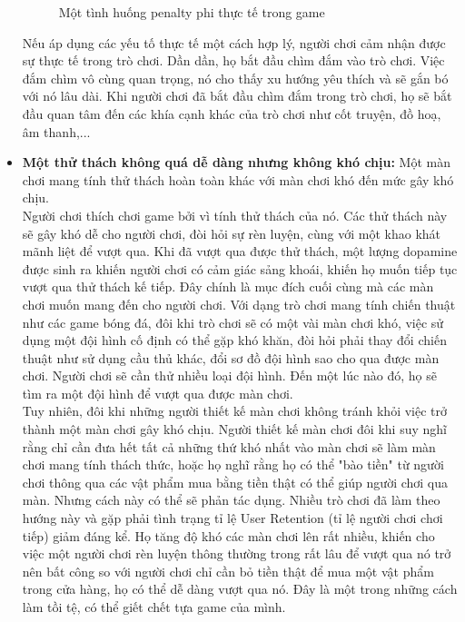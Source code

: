 \begin{itemize}
\begin{figure}[H]
		\vspace{0.5cm}
		\caption{Một tình huống penalty phi thực tế trong game}
	\end{figure}
	Nếu áp dụng các yếu tố thực tế một cách hợp lý, người chơi cảm nhận được sự thực tế trong trò chơi. Dần dần, họ bắt đầu chìm đắm vào trò chơi. Việc đắm chìm vô cùng quan trọng, nó cho thấy xu hướng yêu thích và sẽ gắn bó với nó lâu dài. Khi người chơi đã bắt đầu chìm đắm trong trò chơi, họ sẽ bắt đầu quan tâm đến các khía cạnh khác của trò chơi như cốt truyện, đồ hoạ, âm thanh,...
	\item \textbf{Một thử thách không quá dễ dàng nhưng không khó chịu: } Một màn chơi mang tính thử thách hoàn toàn khác với màn chơi khó đến mức gây khó chịu.\\
	Người chơi thích chơi game bởi vì tính thử thách của nó. Các thử thách này sẽ gây khó dễ cho người chơi, đòi hỏi sự rèn luyện, cùng với một khao khát mãnh liệt để vượt qua. Khi đã vượt qua được thử thách, một lượng dopamine được sinh ra khiến người chơi có cảm giác sảng khoái, khiến họ muốn tiếp tục vượt qua thử thách kế tiếp. Đây chính là mục đích cuối cùng mà các màn chơi muốn mang đến cho người chơi. Với dạng trò chơi mang tính chiến thuật như các game bóng đá, đôi khi trò chơi sẽ có một vài màn chơi khó, việc sử dụng một đội hình cố định có thể gặp khó khăn, đòi hỏi phải thay đổi chiến thuật như sử dụng cầu thủ khác, đổi sơ đồ đội hình sao cho qua được màn chơi. Người chơi sẽ cần thử nhiều loại đội hình. Đến một lúc nào đó, họ sẽ tìm ra một đội hình để vượt qua được màn chơi.\\
	Tuy nhiên, đôi khi những người thiết kế màn chơi không tránh khỏi việc trở thành một màn chơi gây khó chịu. Người thiết kế màn chơi đôi khi suy nghĩ rằng chỉ cần đưa hết tất cả những thứ khó nhất vào màn chơi sẽ làm màn chơi mang tính thách thức, hoặc họ nghĩ rằng họ có thể "bào tiền" từ người chơi thông qua các vật phẩm mua bằng tiền thật có thể giúp người chơi qua màn. Nhưng cách này có thể sẽ phản tác dụng. Nhiều trò chơi đã làm theo hướng này và gặp phải tình trạng tỉ lệ User Retention (tỉ lệ người chơi chơi tiếp) giảm đáng kể. Họ tăng độ khó các màn chơi lên rất nhiều, khiến cho việc một người chơi rèn luyện thông thường trong rất lâu để vượt qua nó trở nên bất công so với người chơi chỉ cần bỏ tiền thật để mua một vật phẩm trong cửa hàng, họ có thể dễ dàng vượt qua nó. Đây là một trong những cách làm tồi tệ, có thể giết chết tựa game của mình.\\

\end{itemize}
